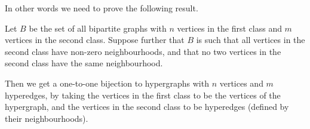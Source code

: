 In other words we need to prove the following result.

\begin{theorem}

Let $B$ be the set of all bipartite graphs with $n$ vertices in the first class and $m$ vertices in the second class.
Suppose further that $B$ is such that all vertices in the second class have non-zero neighbourhoods, and that no two vertices in the second class have the same neighbourhood.

Then we get a one-to-one bijection to hypergraphs with $n$ vertices and $m$ hyperedges, by taking the vertices in the first class to be the vertices of the hypergraph, and the vertices in the second class to be hyperedges (defined by their neighbourhoods).

\end{theorem}
